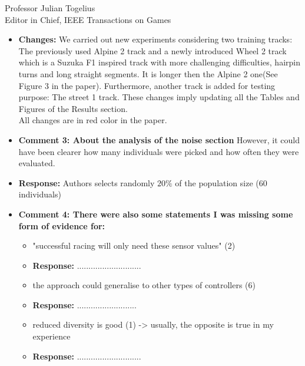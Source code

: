 \documentclass[10pt]{letter} %
\begin{document}
\begin{letter}{Professor Julian Togelius \\ Editor in Chief, IEEE Transactions on Games}
\begin{enumerate}
\begin{itemize}
		\item {\bf Changes:}
		We carried out new experiments considering two training tracks: The previously used Alpine 2 track and a newly introduced Wheel 2 track  which is a Suzuka F1 inspired track with more challenging difficulties, hairpin turns and long straight segments. It is longer then the Alpine 2 one(See Figure 3 in the paper).
		Furthermore, another track is added for testing purpose: The street 1 track.
		These changes imply updating all the Tables and Figures of the Results section.\\
		All changes are in red color in the paper.
		
		
		 
		\item {\bf   Comment 3:	About the analysis of the noise section} However, it could have been clearer how many individuals were picked and how often they were evaluated.\\
		\item {\bf Response:}
		Authors selects randomly $20\%$ of the population size (60 individuals)
	
		\item {\bf   Comment 4: There were also some statements I was missing some form of evidence for:}
			\begin{itemize}
			\item	"successful racing will only need these sensor values" (2)\\
					\item {\bf Response:} ............................
			\item	the approach could generalise to other types of controllers (6)\\
					\item {\bf Response:} ..........................
			\item	reduced diversity is good (1) -> usually, the opposite is true in my experience\\
					\item {\bf Response:} ............................
			\end{itemize}


\end{itemize}
\end{enumerate}
\end{letter}
\end{document}
